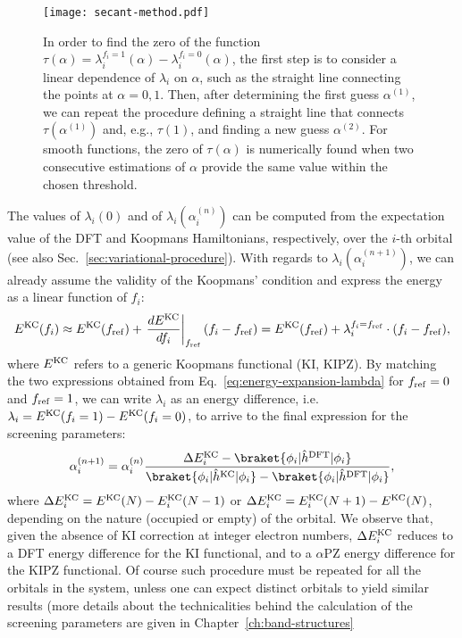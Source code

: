 \begin{figure}
    \centering
    \texttt{[image: secant-method.pdf]}
    \caption[Secant method to determine the screening parameters]{In order to find the zero of the function $\tau(\alpha) = \lambda_i^{f_i=1}(\alpha) - \lambda_i^{f_i=0}(\alpha)$, the first step is to consider a linear dependence of $\lambda_i$ on $\alpha$, such as the straight line connecting the points at $\alpha=0,1$. Then, after determining the first guess $\alpha^{(1)}$, we can repeat the procedure defining a straight line that connects $\tau(\alpha^{(1)})$ and, e.g., $\tau(1)$, and finding a new guess $\alpha^{(2)}$. For smooth functions, the zero of $\tau(\alpha)$ is numerically found when two consecutive estimations of $\alpha$ provide the same value within the chosen threshold.}
    \label{fig:secant-method}
\end{figure}

The values of $\lambda_i(0)$ and of $\lambda_i(\alpha_i^{(n)})$ can be computed from the expectation value of the DFT and Koopmans Hamiltonians, respectively, over the $i$-th orbital (see also Sec.~\ref{sec:variational-procedure}). With regards to $\lambda_i(\alpha_i^{(n+1)})$, we can already assume the validity of the Koopmans' condition and express the energy as a linear function of $f_i$:
%
\begin{equation}
    E^{\rm KC}(f_i) \approx E^{\rm KC}(f_{\rm ref}) + \left. \frac{dE^{\rm KC}}{df_i} \right|_{f_{\rm ref}} (f_i-f_{\rm ref}) =
    E^{\rm KC}(f_{\rm ref}) + \lambda_i^{f_i=f_{\rm ref}} \cdot (f_i-f_{\rm ref}) ,
    \label{eq:energy-expansion-lambda}
\end{equation}
%
where $E^{\rm KC}$ refers to a generic Koopmans functional (KI, KIPZ). By matching the two expressions obtained from Eq.~\eqref{eq:energy-expansion-lambda} for $f_{\rm ref} = 0$ and $f_{\rm ref} = 1$, we can write $\lambda_i$ as an energy difference, i.e. $\lambda_i = E^{\rm KC}(f_i=1) - E^{\rm KC}(f_i=0)$, to arrive to the final expression for the screening parameters:
%
\begin{equation}
    \alpha_i^{(n+1)} = \alpha_i^{(n)} \frac{\Delta E^{\rm KC}_i - \braket{\phi_i|\hat{h}^{\rm DFT}|\phi_i}}{\braket{\phi_i|\hat{h}^{\rm KC}|\phi_i} - \braket{\phi_i|\hat{h}^{\rm DFT}|\phi_i}} ,
    \label{eq:screening-parameter-iterative}
\end{equation}
%
where $\Delta E^{\rm KC}_i = E^{\rm KC}(N) - E^{\rm KC}_i(N-1)$ or $\Delta E^{\rm KC}_i = E^{\rm KC}_i(N+1) - E^{\rm KC}(N)$, depending on the nature (occupied or empty) of the orbital. We observe that, given the absence of KI correction at integer electron numbers, $\Delta E^{\rm KC}_i$ reduces to a DFT energy difference for the KI functional, and to a $\alpha$PZ energy difference for the KIPZ functional. Of course such procedure must be repeated for all the orbitals in the system, unless one can expect distinct orbitals to yield similar results (more details about the technicalities behind the calculation of the screening parameters are given in Chapter~\ref{ch:band-structures}


